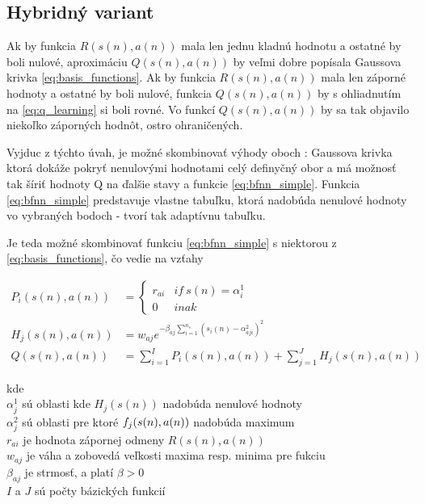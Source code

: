 \subsection{Hybridný variant}

Ak by funkcia $R(s(n), a(n))$ mala len jednu kladnú hodnotu a ostatné by boli
nulové, aproximáciu $Q(s(n), a(n))$ by veľmi dobre popísala Gaussova krivka \ref{eq:basis_functions}.
Ak by funkcia $R(s(n), a(n))$ mala len záporné hodnoty a ostatné by boli
nulové, funkcia $Q(s(n), a(n))$ by s ohliadnutím na \ref{eq:q_learning}
si boli rovné. Vo funkcí $Q(s(n), a(n))$ by sa tak objavilo niekoľko záporných
hodnôt, ostro ohraničených.

Vyjduc z týchto úvah, je možné skombinovať výhody oboch : Gaussova krivka
ktorá dokáže pokryť nenulovými hodnotami celý definyčný obor a má
možnosť tak šíriť hodnoty Q na ďalšie stavy a funkcie \ref{eq:bfnn_simple}.
Funkcia \ref{eq:bfnn_simple} predstavuje vlastne tabuľku, ktorá nadobúda
nenulové hodnoty vo vybraných bodoch - tvorí tak adaptívnu tabuľku.

Je teda možné skombinovať funkciu \ref{eq:bfnn_simple} s niektorou z \ref{eq:basis_functions},
čo vedie na vzťahy

\begin{align}
P_i(s(n), a(n)) &=
\left\{
	\begin{array}{ll}
		r_{ai}  & if \ s(n) = \alpha^1_i \\
		0 & inak
	\end{array}
\right. \\
  H_j(s(n), a(n)) &= w_{aj} e^{ -\beta_{aj} \sum\limits_{i=1}^{n_s}{(s_i(n) - \alpha^2_{aji})^2 }} \\
  Q(s(n), a(n)) &= \sum\limits_{i=1}^{I} P_i(s(n),a(n)) + \sum\limits_{j=1}^{J} H_j(s(n), a(n))
  \label{eq:peak_hill}
\end{align}

kde \\
$\alpha^1_j$ sú oblasti kde $H_j(s(n))$ nadobúda nenulové hodnoty \\
$\alpha^2_j$ sú oblasti pre ktoré $f_j(\boldmath{s(n), a(n)})$ nadobúda maximum \\
$r_{ai}$ je hodnota zápornej odmeny $R(s(n), a(n))$ \\
$w_{aj}$ je váha a zobovedá veľkosti maxima resp. minima pre fukciu \\
$\beta_{aj}$ je strmosť, a platí $\beta > 0$ \\
$I$ a $J$ sú počty bázických funkcií \\

